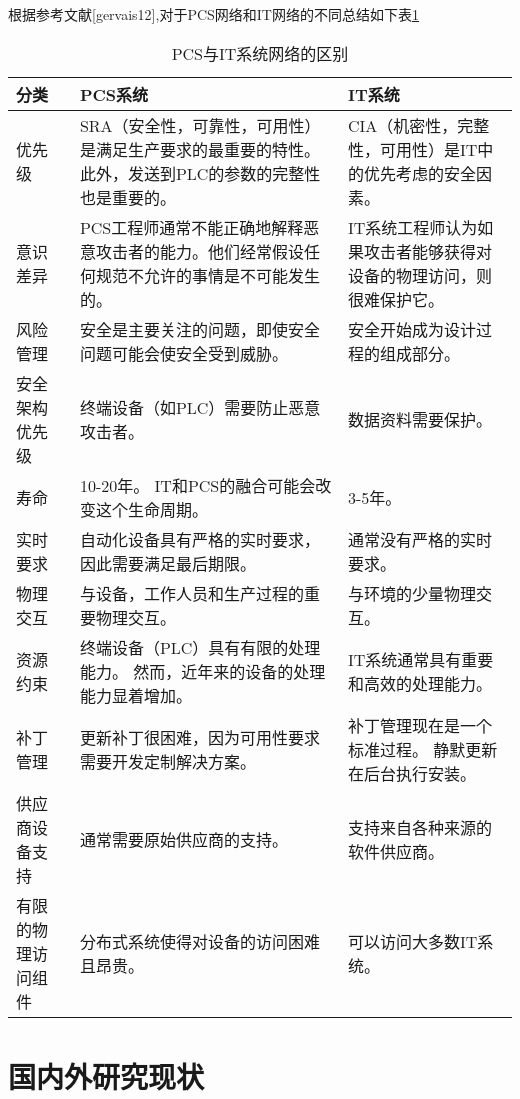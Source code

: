 根据参考文献[gervais12],对于PCS网络和IT网络的不同总结如下表\ref{intro:diffBetweenPCSandIT}
\newcommand{\tabincell}[2]{\begin{tabular}{@{}#1@{}}#2\end{tabular}}  
\begin{table}[!htp]
\centering
\caption{PCS与IT系统网络的区别}
\label{intro:diffBetweenPCSandIT}
\begin{tabular}{|p{2cm}|p{6cm}|p{6cm}|}
\hline
分类 & PCS系统 & IT系统 \\
\hline
优先级 & SRA（安全性，可靠性，可用性）是满足生产要求的最重要的特性。此外，发送到PLC的参数的完整性也是重要的。 & CIA（机密性，完整性，可用性）是IT中的优先考虑的安全因素。 \\
\hline
意识差异 & PCS工程师通常不能正确地解释恶意攻击者的能力。他们经常假设任何规范不允许的事情是不可能发生的。 & IT系统工程师认为如果攻击者能够获得对设备的物理访问，则很难保护它。 \\
\hline
风险管理 & 安全是主要关注的问题，即使安全问题可能会使安全受到威胁。 & 安全开始成为设计过程的组成部分。 \\
\hline
安全架构优先级 & 终端设备（如PLC）需要防止恶意攻击者。 & 数据资料需要保护。 \\
\hline
寿命 & 10-20年。 IT和PCS的融合可能会改变这个生命周期。 & 3-5年。 \\
\hline
实时要求 & 自动化设备具有严格的实时要求，因此需要满足最后期限。 & 通常没有严格的实时要求。 \\
\hline
物理交互 & 与设备，工作人员和生产过程的重要物理交互。 & 与环境的少量物理交互。 \\
\hline
资源约束 & 终端设备（PLC）具有有限的处理能力。 然而，近年来的设备的处理能力显着增加。 & IT系统通常具有重要和高效的处理能力。 \\
\hline
补丁管理 & 更新补丁很困难，因为可用性要求 需要开发定制解决方案。 & 补丁管理现在是一个标准过程。 静默更新在后台执行安装。 \\
\hline
供应商设备支持 & 通常需要原始供应商的支持。 & 支持来自各种来源的软件供应商。 \\
\hline
有限的物理访问组件 & 分布式系统使得对设备的访问困难且昂贵。 & 可以访问大多数IT系统。\\
\hline
\end{tabular}
\end{table}


\section{国内外研究现状}

